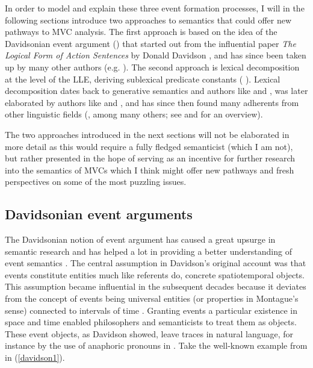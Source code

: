 In order to model and explain these three event formation processes, I will in the following sections introduce two approaches to semantics that could offer new pathways to MVC analysis. The first approach is based on the idea of the Davidsonian event argument () that started out from the influential paper \textit{The Logical Form of Action Sentences} by Donald Davidson \citep{davidson1967logical}, and has since been taken up by many other authors (e.g. \citealt{higginbotham1985semantics, higginbotham2000events, kratzer1995individual, chierchia19953, maienborn2005limits, maienborn2011event}). The second approach is lexical decomposition at the level of the LLE, deriving sublexical predicate constants ( ). Lexical decomposition dates back to generative semantics and authors like \citet{lakoff1970linguistics} and \citet{mccawley1971prelexical}, was later elaborated by authors like \citet{Dowty1979} and \citet{Jackendoff1990}, and has since then found many adherents from other linguistic fields (\citealt{rappaport1998building, levin2005argument, van1997syntax}, among many others; see \citealt{engelberg2011frameworks} and \citealt{wunderlich2012lexical} for an overview).

The two approaches introduced in the next sections will not be elaborated in more detail as this would require a fully fledged semanticist (which I am not), but rather presented in the hope of serving as an incentive for further research into the semantics of MVCs which I think might offer new pathways and fresh perspectives on some of the most puzzling issues.

\subsection{Davidsonian event arguments} \label{sec:davidsonian}

The Davidsonian notion of event argument has caused a great upsurge in semantic research and has helped a lot in providing a better understanding of event semantics \citep{maienborn2005limits}. The central assumption in Davidson's original account was that events constitute entities much like referents do, concrete spatiotemporal objects. This assumption became influential in the subsequent decades because it deviates from the concept of events being universal entities (or properties in Montague's sense) connected to intervals of time \citep{pianesi2000events}. Granting events a particular existence in space and time enabled philosophers and semanticists to treat them as objects. These event objects, as Davidson showed, leave traces in natural language, for instance by the use of anaphoric pronouns in . Take the well-known example from \citet{davidson1967logical} in (\ref{davidson1}).

